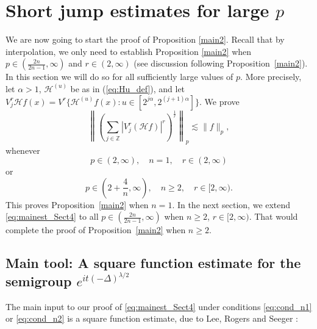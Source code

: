 \documentclass[12pt,leqno]{amsart}
\def\Z{\mathbb{Z}}
\theoremstyle{plain}
\numberwithin{equation}{section}
\begin{document}
\section{Short jump estimates for large $p$}\label{section:short-jump-large}
 
We are now going to start the proof of Proposition \ref{main2}. Recall that by interpolation, we only need to establish Proposition \ref{main2} when $p \in (\frac{2n}{2n-1},\infty)$ and $r \in (2,\infty)$ (see discussion following Proposition~\ref{main2}).
In this section we will do so for all sufficiently large values of $p$. 
More precisely, let $\alpha > 1$, $\mathcal{H}^{(u)}$ be as in (\ref{eq:Hu_def}), and let $V^{r}_{ j}{\mathcal{H} f}(x)
= V^{r} \{\mathcal{H}^{(u)} f (x) \colon u \in [2^{j\alpha}, 2^{(j+1)\alpha}]\}$. We prove
\begin{equation} \label{eq:mainest_Sect4}
\left\| \left(\sum_{j\in \Z} |V_j^{r} (\mathcal{H}f)|^{r} \right)^{\frac{1}{r}}\right\|_p \lesssim \|f\|_p,
\end{equation}
whenever
\begin{equation} \label{eq:cond_n1}
p \in (2,\infty), \quad n = 1, \quad r \in (2, \infty) 
\end{equation}
or 
\begin{equation} \label{eq:cond_n2}
p \in \left(2+\frac{4}{n}, \infty \right), \quad n \geq 2, \quad r \in [2, \infty).
\end{equation}  
This proves Proposition~\ref{main2} when $n = 1$. In the next section, we extend \eqref{eq:mainest_Sect4} to all $p \in ( \frac{2n}{2n-1},\infty)$ when $n \geq 2$, $r \in [2,\infty)$. That would complete the proof of Proposition~\ref{main2} when $n \geq 2$.

\subsection{Main tool: A square function estimate for the semigroup $e^{it(-\Delta)^{\lambda/2}}$} The main input to our proof of \eqref{eq:mainest_Sect4} under conditions \eqref{eq:cond_n1} or \eqref{eq:cond_n2} is a square function estimate, due to Lee, Rogers and Seeger \cite{MR2946085}:
\end{document}
